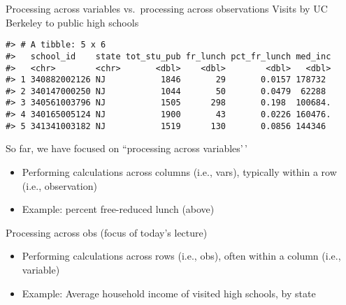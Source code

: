 \documentclass[
  8pt,
  ignorenonframetext,
  dvipsnames]{beamer}
\providecommand{\tightlist}{%
  \setlength{\itemsep}{0pt}\setlength{\parskip}{0pt}}
\let\olditem\item
\renewcommand{\item}{%
  \olditem\vspace{4pt}
}
\begin{document}
\begin{frame}[fragile]{Processing across variables vs.~processing across
observations}
\protect\hypertarget{processing-across-variables-vs.-processing-across-observations}{}
Visits by UC Berkeley to public high schools

\begin{verbatim}
#> # A tibble: 5 x 6
#>   school_id    state tot_stu_pub fr_lunch pct_fr_lunch med_inc
#>   <chr>        <chr>       <dbl>    <dbl>        <dbl>   <dbl>
#> 1 340882002126 NJ           1846       29       0.0157 178732 
#> 2 340147000250 NJ           1044       50       0.0479  62288 
#> 3 340561003796 NJ           1505      298       0.198  100684.
#> 4 340165005124 NJ           1900       43       0.0226 160476.
#> 5 341341003182 NJ           1519      130       0.0856 144346
\end{verbatim}

\medskip

So far, we have focused on ``processing across variables'\,'

\begin{itemize}
\tightlist
\item
  Performing calculations across columns (i.e., vars), typically within
  a row (i.e., observation)
\item
  Example: percent free-reduced lunch (above)
\end{itemize}

\medskip

Processing across obs (focus of today's lecture)

\begin{itemize}
\tightlist
\item
  Performing calculations across rows (i.e., obs), often within a column
  (i.e., variable)
\item
  Example: Average household income of visited high schools, by state
\end{itemize}
\end{frame}
\end{document}
